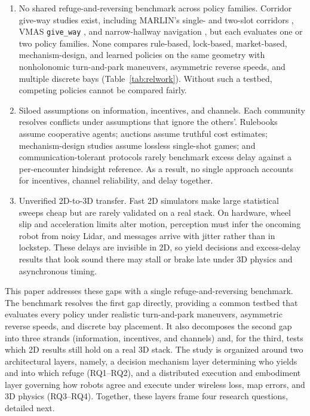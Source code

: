 \begin{enumerate}
\item No shared refuge-and-reversing benchmark across policy families. Corridor give-way studies exist, including MARLIN's single- and two-slot corridors \cite{marlin2024}, VMAS \texttt{give\_way} \cite{vmasgiveway}, and narrow-hallway navigation \cite{park2023hallucination,alghamdi2025opinion}, but each evaluates one or two policy families. None compares rule-based, lock-based, market-based, mechanism-design, and learned policies on the same geometry with nonholonomic turn-and-park maneuvers, asymmetric reverse speeds, and multiple discrete bays (Table~\ref{tab:relwork}). Without such a testbed, competing policies cannot be compared fairly.

\item Siloed assumptions on information, incentives, and channels. Each community resolves conflicts under assumptions that ignore the others'. Rulebooks assume cooperative agents; auctions assume truthful cost estimates; mechanism-design studies assume lossless single-shot games; and communication-tolerant protocols rarely benchmark excess delay against a per-encounter hindsight reference. As a result, no single approach accounts for incentives, channel reliability, and delay together.

\item Unverified 2D-to-3D transfer. Fast 2D simulators make large statistical sweeps cheap but are rarely validated on a real stack. On hardware, wheel slip and acceleration limits alter motion, perception must infer the oncoming robot from noisy Lidar, and messages arrive with jitter rather than in lockstep. These delays are invisible in 2D, so yield decisions and excess-delay results that look sound there may stall or brake late under 3D physics and asynchronous timing.
\end{enumerate}

This paper addresses these gaps with a single refuge-and-reversing benchmark. The benchmark resolves the first gap directly, providing a common testbed that evaluates every policy under realistic turn-and-park maneuvers, asymmetric reverse speeds, and discrete bay placement. It also decomposes the second gap into three strands (information, incentives, and channels) and, for the third, tests which 2D results still hold on a real 3D stack. The study is organized around two architectural layers, namely, a decision mechanism layer determining who yields and into which refuge (RQ1--RQ2), and a distributed execution and embodiment layer governing how robots agree and execute under wireless loss, map errors, and 3D physics (RQ3--RQ4). Together, these layers frame four research questions, detailed next.

